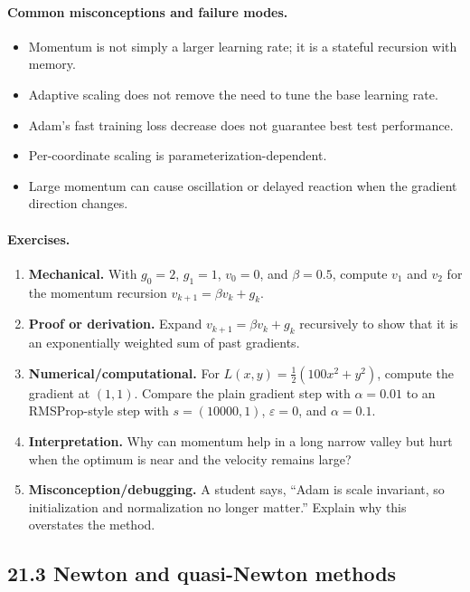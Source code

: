 \paragraph{Common misconceptions and failure modes.}
\begin{itemize}[leftmargin=*]
\item Momentum is not simply a larger learning rate; it is a stateful recursion with memory.
\item Adaptive scaling does not remove the need to tune the base learning rate.
\item Adam's fast training loss decrease does not guarantee best test performance.
\item Per-coordinate scaling is parameterization-dependent.
\item Large momentum can cause oscillation or delayed reaction when the gradient direction changes.
\end{itemize}

\paragraph{Exercises.}
\begin{enumerate}[label=\textbf{21.2.\arabic*.}, leftmargin=*]
\item \textbf{Mechanical.} With \(g_0=2\), \(g_1=1\), \(v_0=0\), and \(\beta=0.5\), compute \(v_1\) and \(v_2\) for the momentum recursion \(v_{k+1}=\beta v_k+g_k\).
\item \textbf{Proof or derivation.} Expand \(v_{k+1}=\beta v_k+g_k\) recursively to show that it is an exponentially weighted sum of past gradients.
\item \textbf{Numerical/computational.} For \(L(x,y)=\frac12(100x^2+y^2)\), compute the gradient at \((1,1)\). Compare the plain gradient step with \(\alpha=0.01\) to an RMSProp-style step with \(s=(10000,1)\), \(\varepsilon=0\), and \(\alpha=0.1\).
\item \textbf{Interpretation.} Why can momentum help in a long narrow valley but hurt when the optimum is near and the velocity remains large?
\item \textbf{Misconception/debugging.} A student says, ``Adam is scale invariant, so initialization and normalization no longer matter.'' Explain why this overstates the method.
\end{enumerate}

\subsection{21.3 Newton and quasi-Newton methods}

